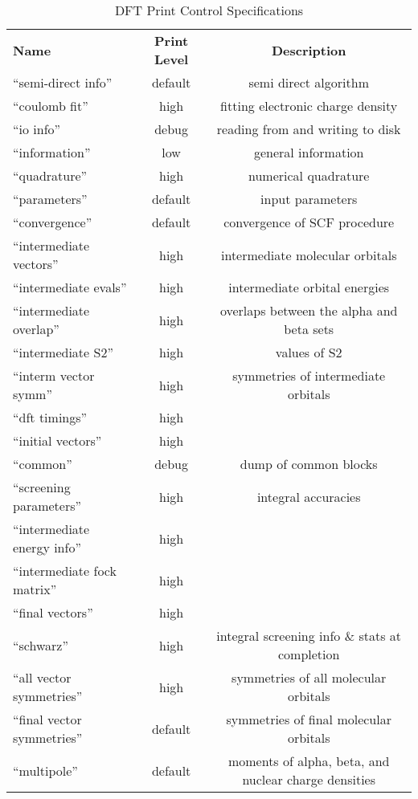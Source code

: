 \begin{table}[htbp]
\begin{center}
\begin{tabular}{lcc}
  {\bf Name}          & {\bf Print Level} & {\bf Description} \\
 ``semi-direct info''               & default     & semi direct algorithm \\
 ``coulomb fit''                    & high        & fitting electronic charge density \\
 ``io info''                        & debug       & reading from and writing to disk  \\
 ``information''                    & low         & general information  \\
 ``quadrature''                     & high        & numerical quadrature  \\
 ``parameters''                     & default     & input parameters \\
 ``convergence''                    & default     & convergence of SCF procedure \\
 ``intermediate vectors''           & high        & intermediate molecular orbitals \\
 ``intermediate evals''             & high        & intermediate orbital energies \\
 ``intermediate overlap''           & high        & overlaps between the alpha and beta sets \\
 ``intermediate S2''                & high        & values of S2 \\
 ``interm vector symm''             & high        & symmetries of intermediate orbitals \\
 ``dft timings''                    & high        & \\
 ``initial vectors''                & high        & \\
 ``common''                         & debug       & dump of common blocks \\
 ``screening parameters''           & high        & integral accuracies \\
 ``intermediate energy info''       & high        & \\
 ``intermediate fock matrix''       & high        & \\
 ``final vectors''                  & high        & \\
 ``schwarz''                        & high        & integral screening info \& stats at completion\\
 ``all vector symmetries''          & high        & symmetries of all molecular orbitals \\
 ``final vector symmetries''        & default     & symmetries of final molecular orbitals \\
 ``multipole''                      & default     & moments of alpha, beta, and nuclear charge densities \\
\end{tabular}
\end{center}
\caption{DFT Print Control Specifications}
\end{table}





